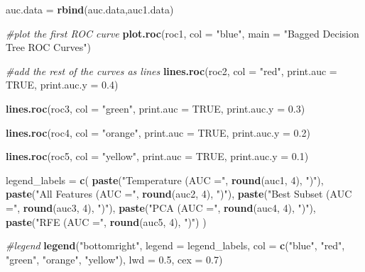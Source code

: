 \documentclass[
]{article}
\newenvironment{Shaded}{\begin{snugshade}}{\end{snugshade}}
\newcommand{\AttributeTok}[1]{\textcolor[rgb]{0.13,0.29,0.53}{#1}}
\newcommand{\CommentTok}[1]{\textcolor[rgb]{0.56,0.35,0.01}{\textit{#1}}}
\newcommand{\ConstantTok}[1]{\textcolor[rgb]{0.56,0.35,0.01}{#1}}
\newcommand{\DecValTok}[1]{\textcolor[rgb]{0.00,0.00,0.81}{#1}}
\newcommand{\FloatTok}[1]{\textcolor[rgb]{0.00,0.00,0.81}{#1}}
\newcommand{\FunctionTok}[1]{\textcolor[rgb]{0.13,0.29,0.53}{\textbf{#1}}}
\newcommand{\NormalTok}[1]{#1}
\newcommand{\OtherTok}[1]{\textcolor[rgb]{0.56,0.35,0.01}{#1}}
\newcommand{\StringTok}[1]{\textcolor[rgb]{0.31,0.60,0.02}{#1}}
\begin{document}
\begin{Shaded}
\begin{Highlighting}[]
\NormalTok{auc.data }\OtherTok{=} \FunctionTok{rbind}\NormalTok{(auc.data,auc1.data)}

\CommentTok{\#plot the first ROC curve}
\FunctionTok{plot.roc}\NormalTok{(roc1, }\AttributeTok{col =} \StringTok{"blue"}\NormalTok{, }\AttributeTok{main =} \StringTok{"Bagged Decision Tree ROC Curves"}\NormalTok{)}

\CommentTok{\#add the rest of the curves as lines}
\FunctionTok{lines.roc}\NormalTok{(roc2, }\AttributeTok{col =} \StringTok{"red"}\NormalTok{, }\AttributeTok{print.auc =} \ConstantTok{TRUE}\NormalTok{, }\AttributeTok{print.auc.y =} \FloatTok{0.4}\NormalTok{)}

\FunctionTok{lines.roc}\NormalTok{(roc3, }\AttributeTok{col =} \StringTok{"green"}\NormalTok{, }\AttributeTok{print.auc =} \ConstantTok{TRUE}\NormalTok{, }\AttributeTok{print.auc.y =} \FloatTok{0.3}\NormalTok{)}

\FunctionTok{lines.roc}\NormalTok{(roc4, }\AttributeTok{col =} \StringTok{"orange"}\NormalTok{, }\AttributeTok{print.auc =} \ConstantTok{TRUE}\NormalTok{, }\AttributeTok{print.auc.y =} \FloatTok{0.2}\NormalTok{)}

\FunctionTok{lines.roc}\NormalTok{(roc5, }\AttributeTok{col =} \StringTok{"yellow"}\NormalTok{, }\AttributeTok{print.auc =} \ConstantTok{TRUE}\NormalTok{, }\AttributeTok{print.auc.y =} \FloatTok{0.1}\NormalTok{)}

\NormalTok{legend\_labels }\OtherTok{=} \FunctionTok{c}\NormalTok{(}
  \FunctionTok{paste}\NormalTok{(}\StringTok{"Temperature (AUC ="}\NormalTok{, }\FunctionTok{round}\NormalTok{(auc1, }\DecValTok{4}\NormalTok{), }\StringTok{")"}\NormalTok{),}
  \FunctionTok{paste}\NormalTok{(}\StringTok{"All Features (AUC ="}\NormalTok{, }\FunctionTok{round}\NormalTok{(auc2, }\DecValTok{4}\NormalTok{), }\StringTok{")"}\NormalTok{),}
  \FunctionTok{paste}\NormalTok{(}\StringTok{"Best Subset (AUC ="}\NormalTok{, }\FunctionTok{round}\NormalTok{(auc3, }\DecValTok{4}\NormalTok{), }\StringTok{")"}\NormalTok{),}
  \FunctionTok{paste}\NormalTok{(}\StringTok{"PCA (AUC ="}\NormalTok{, }\FunctionTok{round}\NormalTok{(auc4, }\DecValTok{4}\NormalTok{), }\StringTok{")"}\NormalTok{),}
  \FunctionTok{paste}\NormalTok{(}\StringTok{"RFE (AUC ="}\NormalTok{, }\FunctionTok{round}\NormalTok{(auc5, }\DecValTok{4}\NormalTok{), }\StringTok{")"}\NormalTok{)}
\NormalTok{)}

\CommentTok{\#legend}
\FunctionTok{legend}\NormalTok{(}\StringTok{"bottomright"}\NormalTok{, }\AttributeTok{legend =}\NormalTok{ legend\_labels, }\AttributeTok{col =} \FunctionTok{c}\NormalTok{(}\StringTok{"blue"}\NormalTok{, }\StringTok{"red"}\NormalTok{, }\StringTok{"green"}\NormalTok{, }\StringTok{"orange"}\NormalTok{, }\StringTok{"yellow"}\NormalTok{), }\AttributeTok{lwd =} \FloatTok{0.5}\NormalTok{, }\AttributeTok{cex =} \FloatTok{0.7}\NormalTok{)}
\end{Highlighting}
\end{Shaded}
\end{document}
